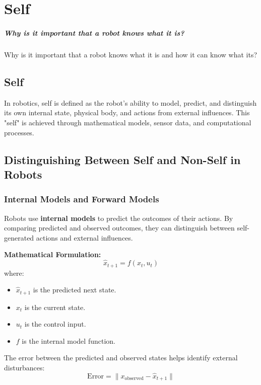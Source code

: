 \chapter{Self}


\paragraph{Why is it important that a robot knows what it is?}
    Why is it important that a robot knows what it is and how it can know what its?

\section{Self}
In robotics, self is defined as the robot's ability to model, predict, and distinguish its own internal state, physical body, and actions from external influences. This "self" is achieved through mathematical models, sensor data, and computational processes.


\section{Distinguishing Between Self and Non-Self in Robots}

\subsection{Internal Models and Forward Models}
Robots use \textbf{internal models} to predict the outcomes of their actions. By comparing predicted and observed outcomes, they can distinguish between self-generated actions and external influences.

\textbf{Mathematical Formulation:}
\begin{equation}
    \hat{x}_{t+1} = f(x_t, u_t)
\end{equation}
where:
\begin{itemize}
    \item \( \hat{x}_{t+1} \) is the predicted next state.
    \item \( x_t \) is the current state.
    \item \( u_t \) is the control input.
    \item \( f \) is the internal model function.
\end{itemize}
The error between the predicted and observed states helps identify external disturbances:
\begin{equation}
    \text{Error} = \| x_{\text{observed}} - \hat{x}_{t+1} \|
\end{equation}

